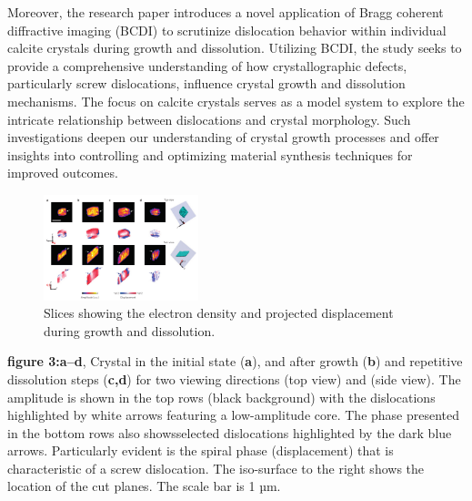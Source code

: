 \documentclass[12pt, a4paper, twocolumn]{article}
\begin{document}
Moreover, the research paper introduces a novel application of Bragg coherent diffractive imaging (BCDI) to scrutinize dislocation behavior within individual calcite crystals during growth and dissolution. Utilizing BCDI, the study seeks to provide a comprehensive understanding of how crystallographic defects, particularly screw dislocations, influence crystal growth and dissolution mechanisms. The focus on calcite crystals serves as a model system to explore the intricate relationship between dislocations and crystal morphology. Such investigations deepen our understanding of crystal growth processes and offer insights into controlling and optimizing material synthesis techniques for improved outcomes.
\begin{figure}[h]
	\includegraphics[width=0.4\textwidth]{3d_imaging_crystal_growth.png}
	\caption{Slices showing the electron density and projected displacement during growth and dissolution.
			}
\end{figure}
\par \textbf{figure 3:}\textbf{a–d}, Crystal in the initial state (\textbf{a}), and after growth (\textbf{b}) and repetitive dissolution steps (\textbf{c,d}) for two viewing directions (top view) and (side view). The amplitude is shown in the top rows (black background) with the  dislocations highlighted by white arrows featuring a low-amplitude core. The phase presented in the bottom rows also showsselected dislocations highlighted by the dark blue arrows. Particularly evident is the spiral phase (displacement) that is characteristic of a screw dislocation. The iso-surface to the right shows the location of the cut planes. The scale bar is 1 µm.
\end{document}
